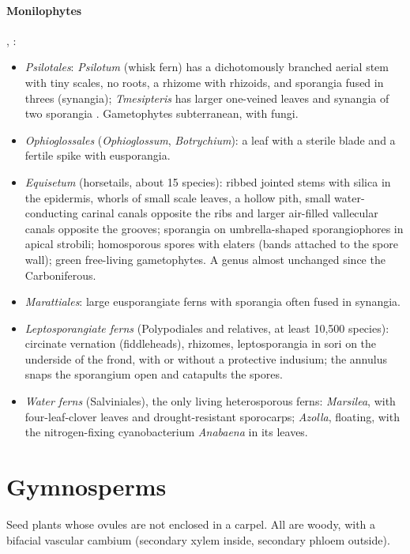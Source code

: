 \paragraph{Monilophytes}
\cite[Chapter 17]{evert2013raven},
\cite[Chapter 21]{stern2008introductory}:
\begin{itemize}
\item \emph{Psilotales}: \emph{Psilotum}
(whisk fern) has a dichotomously branched
aerial stem with tiny scales, no roots, a
rhizome with rhizoids, and sporangia fused
in threes (synangia); \emph{Tmesipteris}
has larger one-veined leaves and
synangia of two sporangia
\cite[Chapter 11]{singh2010plant}.
Gametophytes subterranean, with fungi.
\item \emph{Ophioglossales}
(\emph{Ophioglossum}, \emph{Botrychium}):
a leaf with a sterile blade and a fertile
spike with eusporangia.
\item \emph{Equisetum} (horsetails, about
15 species): ribbed jointed stems with
silica in the epidermis, whorls of small
scale leaves, a hollow pith, small
water-conducting carinal canals opposite the
ribs and larger air-filled vallecular canals
opposite the grooves; sporangia on
umbrella-shaped sporangiophores in apical
strobili; homosporous spores with elaters
(bands attached to the spore wall); green
free-living gametophytes. A genus almost
unchanged since the Carboniferous.
\item \emph{Marattiales}: large eusporangiate
ferns with sporangia often fused in
synangia.
\item \emph{Leptosporangiate ferns}
(Polypodiales and relatives, at least 10,500
species): circinate vernation (fiddleheads),
rhizomes, leptosporangia in sori on the
underside of the frond, with or without a
protective indusium; the annulus snaps the
sporangium open and catapults the spores.
\item \emph{Water ferns} (Salviniales), the
only living heterosporous ferns:
\emph{Marsilea}, with four-leaf-clover
leaves and drought-resistant sporocarps;
\emph{Azolla}, floating, with the
nitrogen-fixing cyanobacterium
\emph{Anabaena} in its leaves.
\end{itemize}

\section{Gymnosperms}
\label{section-gymnosperms}

Seed plants whose ovules are not enclosed in
a carpel. All are woody, with a bifacial
vascular cambium (secondary xylem inside,
secondary phloem outside).


